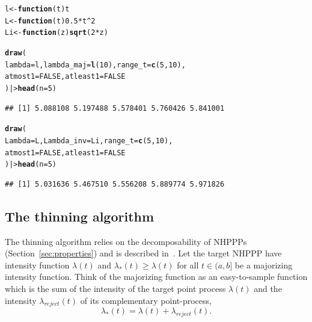 \documentclass[article,nojss]{jss}\usepackage[]{graphicx}\usepackage[]{xcolor}
\makeatletter
\newcommand{\hlnum}[1]{\textcolor[rgb]{0.686,0.059,0.569}{#1}}%
\newcommand{\hlopt}[1]{\textcolor[rgb]{0,0,0}{#1}}%
\newcommand{\hlstd}[1]{\textcolor[rgb]{0.345,0.345,0.345}{#1}}%
\newcommand{\hlkwa}[1]{\textcolor[rgb]{0.161,0.373,0.58}{\textbf{#1}}}%
\newcommand{\hlkwb}[1]{\textcolor[rgb]{0.69,0.353,0.396}{#1}}%
\newcommand{\hlkwc}[1]{\textcolor[rgb]{0.333,0.667,0.333}{#1}}%
\newcommand{\hlkwd}[1]{\textcolor[rgb]{0.737,0.353,0.396}{\textbf{#1}}}%
\newenvironment{kframe}{%
 \def\at@end@of@kframe{}%
 \ifinner\ifhmode%
  \def\at@end@of@kframe{\end{minipage}}%
  \begin{minipage}{\columnwidth}%
 \fi\fi%
 \def\FrameCommand##1{\hskip\@totalleftmargin \hskip-\fboxsep
 \colorbox{shadecolor}{##1}\hskip-\fboxsep
     \hskip-\linewidth \hskip-\@totalleftmargin \hskip\columnwidth}%
 \MakeFramed {\advance\hsize-\width
   \@totalleftmargin\z@ \linewidth\hsize
   \@setminipage}}%
 {\par\unskip\endMakeFramed%
 \at@end@of@kframe}
\newenvironment{knitrout}{}{} %
\makeatother
\begin{document}
\begin{knitrout}
\color{fgcolor}\begin{kframe}
\begin{alltt}
\hlstd{l} \hlkwb{<-} \hlkwa{function}\hlstd{(}\hlkwc{t}\hlstd{) t}
\hlstd{L} \hlkwb{<-} \hlkwa{function}\hlstd{(}\hlkwc{t}\hlstd{)} \hlnum{0.5} \hlopt{*} \hlstd{t}\hlopt{^}\hlnum{2}
\hlstd{Li} \hlkwb{<-} \hlkwa{function}\hlstd{(}\hlkwc{z}\hlstd{)} \hlkwd{sqrt}\hlstd{(}\hlnum{2} \hlopt{*} \hlstd{z)}

\hlkwd{draw}\hlstd{(}
  \hlkwc{lambda} \hlstd{= l,} \hlkwc{lambda_maj} \hlstd{=} \hlkwd{l}\hlstd{(}\hlnum{10}\hlstd{),} \hlkwc{range_t} \hlstd{=} \hlkwd{c}\hlstd{(}\hlnum{5}\hlstd{,} \hlnum{10}\hlstd{),}
  \hlkwc{atmost1} \hlstd{=} \hlnum{FALSE}\hlstd{,} \hlkwc{atleast1} \hlstd{=} \hlnum{FALSE}
\hlstd{) |>} \hlkwd{head}\hlstd{(}\hlkwc{n} \hlstd{=} \hlnum{5}\hlstd{)}
\end{alltt}
\begin{verbatim}
## [1] 5.088108 5.197488 5.578401 5.760426 5.841001
\end{verbatim}
\begin{alltt}
\hlkwd{draw}\hlstd{(}
  \hlkwc{Lambda} \hlstd{= L,} \hlkwc{Lambda_inv} \hlstd{= Li,} \hlkwc{range_t} \hlstd{=} \hlkwd{c}\hlstd{(}\hlnum{5}\hlstd{,} \hlnum{10}\hlstd{),}
  \hlkwc{atmost1} \hlstd{=} \hlnum{FALSE}\hlstd{,} \hlkwc{atleast1} \hlstd{=} \hlnum{FALSE}
\hlstd{) |>} \hlkwd{head}\hlstd{(}\hlkwc{n} \hlstd{=} \hlnum{5}\hlstd{)}
\end{alltt}
\begin{verbatim}
## [1] 5.031636 5.467510 5.556208 5.889774 5.971826
\end{verbatim}
\end{kframe}
\end{knitrout}

\subsection{The thinning algorithm}\label{sec:thinning}
The thinning algorithm relies on the decomposability of NHPPPs (Section~\ref{sec:properties}) and is described in~\citet{lewis1979thinning}. Let the target NHPPP have intensity function $\lambda(t)$ and $\lambda_*(t) \ge \lambda(t)$ for all $t \in (a, b]$ be a majorizing intensity function. Think of the majorizing function as an easy-to-sample function which is the sum of the intensity of the target point process $\lambda(t)$ and the intensity $\lambda_{reject}(t)$ of its complementary point-process,
$$\lambda_*(t) = \lambda(t) + \lambda_{reject}(t).$$
\end{document}
